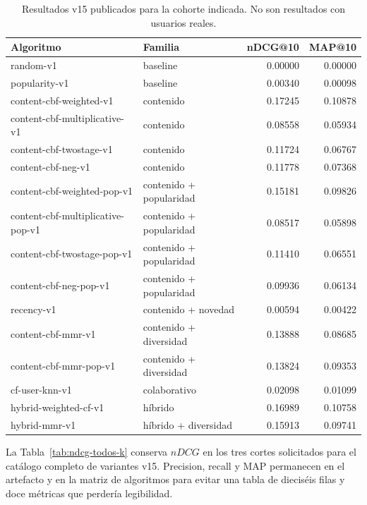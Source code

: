 \begin{table}[htbp]
\centering
\caption{Resultados v15 publicados para la cohorte indicada. No son resultados con usuarios reales.}\label{tab:resultados-ndcg10}
\small
\begin{tabularx}{\textwidth}{@{}>{\ttfamily\raggedright\arraybackslash}p{}Yrr@{}}
\textnormal{Algoritmo} & \textnormal{Familia} & \textnormal{nDCG@10} & \textnormal{MAP@10} \\
\hline
random-v1 & baseline & 0.00000 & 0.00000 \\
popularity-v1 & baseline & 0.00340 & 0.00098 \\
content-cbf-weighted-v1 & contenido & 0.17245 & 0.10878 \\
content-cbf-multiplicative-v1 & contenido & 0.08558 & 0.05934 \\
content-cbf-twostage-v1 & contenido & 0.11724 & 0.06767 \\
content-cbf-neg-v1 & contenido & 0.11778 & 0.07368 \\
content-cbf-weighted-pop-v1 & contenido + popularidad & 0.15181 & 0.09826 \\
content-cbf-multiplicative-pop-v1 & contenido + popularidad & 0.08517 & 0.05898 \\
content-cbf-twostage-pop-v1 & contenido + popularidad & 0.11410 & 0.06551 \\
content-cbf-neg-pop-v1 & contenido + popularidad & 0.09936 & 0.06134 \\
recency-v1 & contenido + novedad & 0.00594 & 0.00422 \\
content-cbf-mmr-v1 & contenido + diversidad & 0.13888 & 0.08685 \\
content-cbf-mmr-pop-v1 & contenido + diversidad & 0.13824 & 0.09353 \\
cf-user-knn-v1 & colaborativo & 0.02098 & 0.01099 \\
hybrid-weighted-cf-v1 & híbrido & 0.16989 & 0.10758 \\
hybrid-mmr-v1 & híbrido + diversidad & 0.15913 & 0.09741 \\
\end{tabularx}
\end{table}

La Tabla~\ref{tab:ndcg-todos-k} conserva \(nDCG\) en los tres cortes solicitados para el catálogo completo de variantes v15. Precision, recall y MAP permanecen en el artefacto y en la matriz de algoritmos para evitar una tabla de dieciséis filas y doce métricas que perdería legibilidad.

